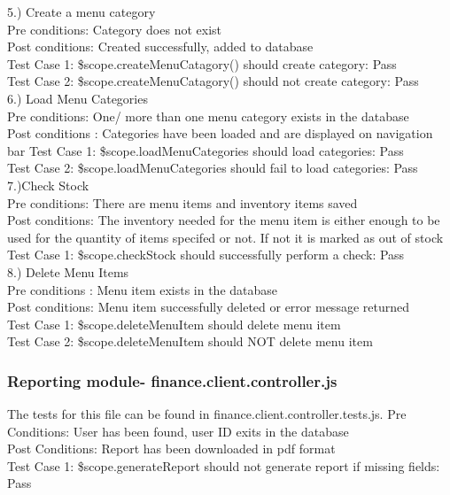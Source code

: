 \documentclass[a4paper,12pt]{report}
\begin{document}
5.) Create a menu category \\ 
Pre conditions: Category does not exist \\
Post conditions: Created successfully, added to database\\
Test Case 1: \$scope.createMenuCatagory() should create category: Pass \\
Test Case 2: \$scope.createMenuCatagory() should not create category: Pass \\

6.) Load Menu Categories \\
Pre conditions: One/ more than one menu category exists in the database \\
Post conditions : Categories have been loaded and are displayed on navigation bar 
Test Case 1: \$scope.loadMenuCategories should load categories: Pass \\
Test Case 2: \$scope.loadMenuCategories should fail to load categories: Pass \\

7.)Check Stock \\
Pre conditions: There are menu items and inventory items saved\\
Post conditions: The inventory needed for the menu item is either enough to be used for the quantity of items specifed or not. If not it is marked as out of stock\\
Test Case 1: \$scope.checkStock should successfully perform a check: Pass \\  

8.) Delete Menu Items \\
Pre conditions : Menu item exists in the database \\
Post conditions: Menu item successfully deleted or error message returned \\
Test Case 1: \$scope.deleteMenuItem should delete menu item \\
Test Case 2: \$scope.deleteMenuItem should NOT delete menu item\\

\subsubsection{ Reporting module- finance.client.controller.js}
The tests for this file can be found in finance.client.controller.tests.js.
Pre Conditions: User has been found, user ID exits in the database \\
Post Conditions: Report has been downloaded in pdf format\\
Test Case 1: \$scope.generateReport should not generate report if missing fields: Pass \\
\end{document}
